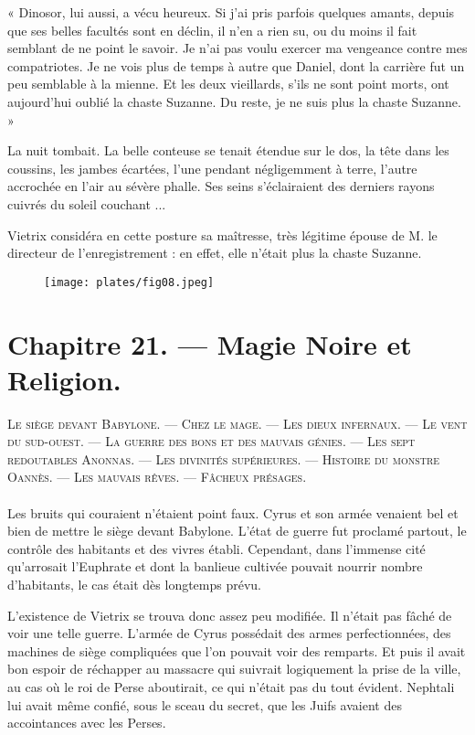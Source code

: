\documentclass[a4paper, 11pt, oneside, polutonikogreek, french]{article}
\begin{document}
« Dinosor, lui aussi, a vécu heureux. Si j'ai pris parfois quelques amants, depuis que ses belles facultés sont en déclin, il n'en a rien su, ou du moins il fait semblant de ne point le savoir. Je n'ai pas voulu exercer ma vengeance contre mes compatriotes. Je ne vois plus de temps à autre que Daniel, dont la carrière fut un peu semblable à la mienne. Et les deux vieillards, s'ils ne sont point morts, ont aujourd'hui oublié la chaste Suzanne. Du reste, je ne suis plus la chaste Suzanne. »

\bigskip
\centerline{\EightStarTaper}
\centerline{\EightStarTaper\EightStarTaper}
\bigskip

La nuit tombait. La belle conteuse se tenait étendue sur le dos, la tête dans les coussins, les jambes écartées, l'une pendant négligemment à terre, l'autre accrochée en l'air au sévère phalle. Ses seins s'éclairaient des derniers rayons cuivrés du soleil couchant ...

Vietrix considéra en cette posture sa maîtresse, très légitime épouse de M. le directeur de l'enregistrement : en effet, elle n'était plus la chaste Suzanne.
\clearpage
\begin{figure}[H]
\centering
\texttt{[image: plates/fig08.jpeg]}
\end{figure}
\section{Chapitre 21. --- Magie Noire et Religion.}
\begin{center}
\scshape
\small
Le siège devant Babylone. --- Chez le mage. --- Les dieux infernaux. --- Le vent du sud-ouest. --- La guerre des bons et des mauvais génies. --- Les sept redoutables Anonnas. --- Les divinités supérieures. --- Histoire du monstre Oannès. --- Les mauvais rêves. --- Fâcheux présages.
\end{center}
\paragraph{}
Les bruits qui couraient n'étaient point faux. Cyrus et son armée venaient bel et bien de mettre le siège devant Babylone. L'état de guerre fut proclamé partout, le contrôle des habitants et des vivres établi. Cependant, dans l'immense cité qu'arrosait l'Euphrate et dont la banlieue cultivée pouvait nourrir nombre d'habitants, le cas était dès longtemps prévu.

L'existence de Vietrix se trouva donc assez peu modifiée. Il n'était pas fâché de voir une telle guerre. L'armée de Cyrus possédait des armes perfectionnées, des machines de siège compliquées que l'on pouvait voir des remparts. Et puis il avait bon espoir de réchapper au massacre qui suivrait logiquement la prise de la ville, au cas où le roi de Perse aboutirait, ce qui n'était pas du tout évident. Nephtali lui avait même confié, sous le sceau du secret, que les Juifs avaient des accointances avec les Perses.
\end{document}
